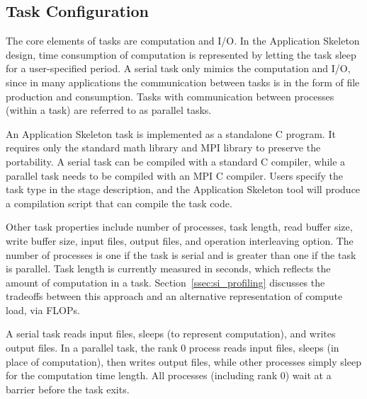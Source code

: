 \documentclass[preprint,12pt]{elsarticle}
\newcommand{\katznote}[1]{ {\textcolor{blue}    { ***Dan:   #1 }}}
\newcommand{\zhaonote}[1]{{\textcolor{cyan}{ ***Zhao:  #1 }}}
\newcommand{\katznote}[1]{}
\newcommand{\zhaonote}[1]{}
\begin{document}
\subsection{Task Configuration}
The core elements of tasks are computation and I/O. In the Application Skeleton
design, time consumption of computation is represented by letting the task sleep
for a user-specified period.  A serial task only mimics the computation and I/O,
since in many applications the communication between tasks is in the form of
file production and consumption. Tasks with communication between processes
(within a task) are referred to as parallel tasks.

An Application Skeleton task is implemented as a standalone C program. It  requires only the standard math library and MPI library to preserve the
portability. A serial task can be compiled with a standard C compiler, while a parallel task needs to be compiled with an MPI C compiler. Users specify the task type in the stage description, and the Application Skeleton tool will produce 
a compilation script that can compile the task code.

Other task properties include number of processes, task length, read buffer size, write buffer size, input files, output files, and
operation interleaving option. The number of processes is one if the task is serial and is greater than one if the task is parallel. 
Task length is currently measured in seconds, which reflects the amount of computation in a task. 
Section~\ref{ssec:si_profiling} discusses the tradeoffs between this approach and an
alternative representation of compute load, via FLOPs.

A serial task reads input files, sleeps (to represent computation), and writes output files. In a parallel task, the rank 0 process reads
input files, sleeps (in place of computation), then writes output files, while other processes simply sleep for the computation time length.  All processes (including rank 0) wait at a barrier before the task exits. 
\end{document}
